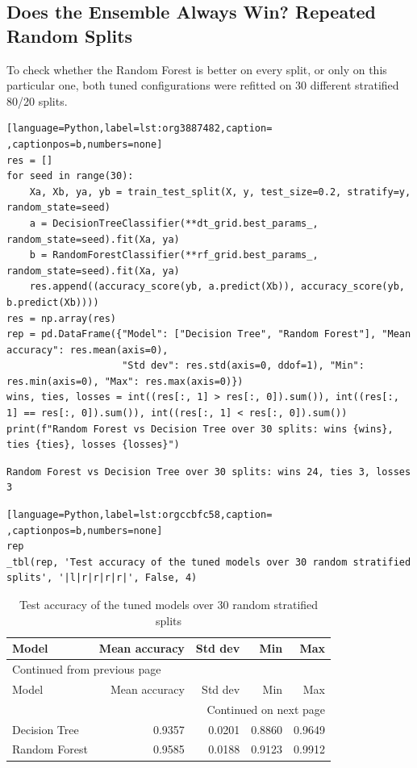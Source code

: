 \documentclass[11pt]{article}
\begin{document}
\subsection*{Does the Ensemble Always Win? Repeated Random Splits}
\label{sec:org71600ec}


To check whether the Random Forest is better on every split, or only on this particular one,
both tuned configurations were refitted on 30 different stratified 80/20 splits.
\begin{lstlisting}[language=Python,label=lst:org3887482,caption= ,captionpos=b,numbers=none]
res = []
for seed in range(30):
    Xa, Xb, ya, yb = train_test_split(X, y, test_size=0.2, stratify=y, random_state=seed)
    a = DecisionTreeClassifier(**dt_grid.best_params_, random_state=seed).fit(Xa, ya)
    b = RandomForestClassifier(**rf_grid.best_params_, random_state=seed).fit(Xa, ya)
    res.append((accuracy_score(yb, a.predict(Xb)), accuracy_score(yb, b.predict(Xb))))
res = np.array(res)
rep = pd.DataFrame({"Model": ["Decision Tree", "Random Forest"], "Mean accuracy": res.mean(axis=0),
                    "Std dev": res.std(axis=0, ddof=1), "Min": res.min(axis=0), "Max": res.max(axis=0)})
wins, ties, losses = int((res[:, 1] > res[:, 0]).sum()), int((res[:, 1] == res[:, 0]).sum()), int((res[:, 1] < res[:, 0]).sum())
print(f"Random Forest vs Decision Tree over 30 splits: wins {wins}, ties {ties}, losses {losses}")
\end{lstlisting}

\begin{verbatim}
Random Forest vs Decision Tree over 30 splits: wins 24, ties 3, losses 3
\end{verbatim}

\begin{lstlisting}[language=Python,label=lst:orgccbfc58,caption= ,captionpos=b,numbers=none]
rep
_tbl(rep, 'Test accuracy of the tuned models over 30 random stratified splits', '|l|r|r|r|r|', False, 4)
\end{lstlisting}

\begin{longtable}{|l|r|r|r|r|}
\caption{Test accuracy of the tuned models over 30 random stratified splits}
\\[0pt]
\hline
Model & Mean accuracy & Std dev & Min & Max\\[0pt]
\hline
\endfirsthead
\multicolumn{5}{l}{Continued from previous page} \\[0pt]
\hline

Model & Mean accuracy & Std dev & Min & Max \\[0pt]

\hline
\endhead
\hline\multicolumn{5}{r}{Continued on next page} \\
\endfoot
\endlastfoot
\hline
Decision Tree & 0.9357 & 0.0201 & 0.8860 & 0.9649\\[0pt]
\hline
Random Forest & 0.9585 & 0.0188 & 0.9123 & 0.9912\\[0pt]
\hline
\end{longtable}
\end{document}
